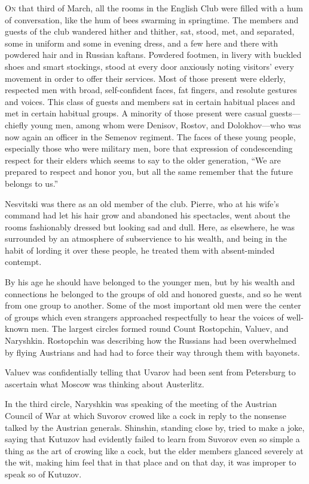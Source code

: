 \lettrine[lines=2, loversize=0.3, lraise=0]{\initfamily O}{n}
that third of March, all the rooms in the English Club were
filled with a hum of conversation, like the hum of bees swarming
in springtime.  The members and guests of the club wandered
hither and thither, sat, stood, met, and separated, some in
uniform and some in evening dress, and a few here and there with
powdered hair and in Russian kaftans.  Powdered footmen, in
livery with buckled shoes and smart stockings, stood at every
door anxiously noting visitors' every movement in order to offer
their services. Most of those present were elderly, respected men
with broad, self-confident faces, fat fingers, and resolute
gestures and voices. This class of guests and members sat in
certain habitual places and met in certain habitual groups. A
minority of those present were casual guests---chiefly young men,
among whom were Denisov, Rostov, and Dolokhov---who was now again
an officer in the Semenov regiment. The faces of these young
people, especially those who were military men, bore that
expression of condescending respect for their elders which seems
to say to the older generation, ``We are prepared to respect and
honor you, but all the same remember that the future belongs to
us.''

Nesvitski was there as an old member of the club. Pierre, who at
his wife's command had let his hair grow and abandoned his
spectacles, went about the rooms fashionably dressed but looking
sad and dull. Here, as elsewhere, he was surrounded by an
atmosphere of subservience to his wealth, and being in the habit
of lording it over these people, he treated them with
absent-minded contempt.

By his age he should have belonged to the younger men, but by his
wealth and connections he belonged to the groups of old and
honored guests, and so he went from one group to another. Some of
the most important old men were the center of groups which even
strangers approached respectfully to hear the voices of
well-known men. The largest circles formed round Count
Rostopchin, Valuev, and Naryshkin. Rostopchin was describing how
the Russians had been overwhelmed by flying Austrians and had had
to force their way through them with bayonets.

Valuev was confidentially telling that Uvarov had been sent from
Petersburg to ascertain what Moscow was thinking about
Austerlitz.

In the third circle, Naryshkin was speaking of the meeting of the
Austrian Council of War at which Suvorov crowed like a cock in
reply to the nonsense talked by the Austrian generals. Shinshin,
standing close by, tried to make a joke, saying that Kutuzov had
evidently failed to learn from Suvorov even so simple a thing as
the art of crowing like a cock, but the elder members glanced
severely at the wit, making him feel that in that place and on
that day, it was improper to speak so of Kutuzov.

